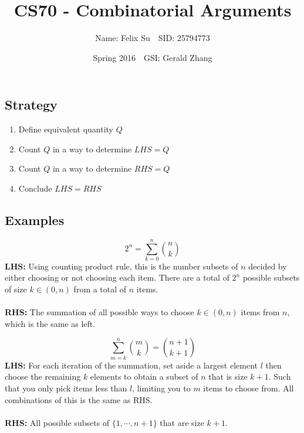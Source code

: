 \documentclass{article}\usepackage{amsmath,amssymb,amsthm,tikz,tkz-graph,color,chngpage,soul,hyperref,csquotes,graphicx,floatrow, listings}\newcommand*{\QEDB}{\hfill\ensuremath{\square}}\newtheorem*{prop}{Proposition}\renewcommand{\theenumi}{\alph{enumi}}\usepackage[shortlabels]{enumitem}\usepackage[nobreak=true]{mdframed}\usetikzlibrary{matrix,calc}\MakeOuterQuote{"}\usepackage[margin=0.75in]{geometry} \newtheorem{theorem}{Theorem}\newcommand{\Z}{\mathbb Z}\newcommand{\R}{\mathbb R}\newcommand{\Q}{\mathbb Q}\newcommand{\N}{\mathbb N}\newcommand{\x}[1]{\textrm{ #1 }}\newcommand{\pr}{\textrm{Pr}}
\title{CS70 - Combinatorial Arguments}
\author{Name: Felix Su$\quad$SID: 25794773}
\date{Spring 2016$\quad$GSI: Gerald Zhang}
\newcommand{\sumlim}[3]{\sum\limits_{#1}^{#2}#3}
\begin{document}
\maketitle

\subsection*{Strategy}
\begin{enumerate}[1.]
    \item Define equivalent quantity $Q$
    \item Count $Q$ in a way to determine $LHS=Q$
    \item Count $Q$ in a way to determine $RHS=Q$
    \item Conclude $LHS=RHS$
\end{enumerate}
\subsection*{Examples}
\begin{mdframed}
\begin{equation}2^n=\sumlim{k=0}{n}{\binom{n}{k}}\end{equation}
\textbf{LHS:} Using counting product rule, this is the number subsets of $n$ decided by either choosing or not choosing each item. There are a total of $2^n$ possible subsets of size $k \in (0,n)$ from a total of $n$ items.\\\\
\textbf{RHS:} The summation of all possible ways to choose $k \in (0,n)$ items from $n$, which is the same as left.
\end{mdframed}
\begin{mdframed}
\begin{equation}\sumlim{m=k}{n}{\binom{m}{k}}=\binom{n+1}{k+1}\end{equation}
\textbf{LHS:} For each iteration of the summation, set aside a largest element $l$ then choose the remaining $k$ elements to obtain a subset of $n$ that is size $k+1$. Such that you only pick items less than $l$, limiting you to $m$ items to choose from. All combinations of this is the same as RHS.\\\\
\textbf{RHS:} All possible subsets of $\{1,\cdots,n+1\}$ that are size $k+1$.
\end{mdframed}
\end{document}
